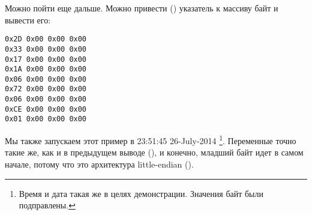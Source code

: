 Можно пойти еще дальше. Можно привести () указатель к массиву байт и вывести его:%



\begin{lstlisting}
0x2D 0x00 0x00 0x00 
0x33 0x00 0x00 0x00 
0x17 0x00 0x00 0x00 
0x1A 0x00 0x00 0x00 
0x06 0x00 0x00 0x00 
0x72 0x00 0x00 0x00 
0x06 0x00 0x00 0x00 
0xCE 0x00 0x00 0x00 
0x01 0x00 0x00 0x00 
\end{lstlisting}

Мы также запускаем этот пример в 23:51:45 26-July-2014
\footnote{Время и дата такая же в целях демонстрации. Значения байт были подправлены.}.
Переменные точно такие же, как и в предыдущем выводе 
(), и конечно, младший байт идет в самом начале, потому что это архитектура 
little-endian ().


